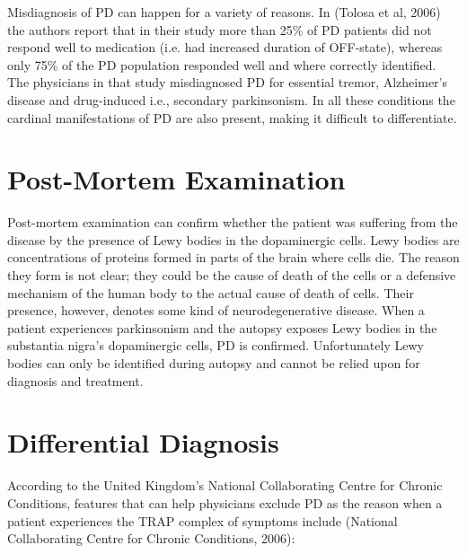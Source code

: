 Misdiagnosis of \gls{PD} can happen for a variety of reasons. In (Tolosa et al, 2006) the authors report that in their study more than 25\% of \gls{PD} patients did not respond well to medication (i.e. had increased duration of OFF-state), whereas only 75\% of the \gls{PD} population responded well and where correctly identified. The physicians in that study misdiagnosed \gls{PD} for essential tremor, Alzheimer's disease and drug-induced i.e., secondary parkinsonism. In all these conditions the cardinal manifestations of \gls{PD} are also present, making it difficult to differentiate. 


\section{Post-Mortem Examination}
\label{sec:lewyBodies}
Post-mortem examination can confirm whether the patient was suffering from the disease by the presence of Lewy bodies in the dopaminergic cells. Lewy bodies are concentrations of proteins formed in parts of the brain where cells die. The reason they form is not clear; they could be the cause of death of the cells or a defensive mechanism of the human body to the actual cause of death of cells. Their presence, however, denotes some kind of neurodegenerative disease. When a patient experiences parkinsonism and the autopsy exposes Lewy bodies in the substantia nigra's dopaminergic cells, \gls{PD} is confirmed. Unfortunately Lewy bodies can only be identified during autopsy and cannot be relied upon for diagnosis and treatment.


\section{Differential Diagnosis}
\label{sec:differential}
According to the United Kingdom's National Collaborating Centre for Chronic Conditions, features that can help physicians exclude \gls{PD} as the reason when a patient experiences the TRAP complex of symptoms include (National Collaborating Centre for Chronic Conditions, 2006):

